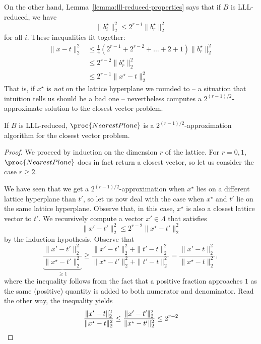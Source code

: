On the other hand,
Lemma~\ref{lemma:lll-reduced-properties} says that if $B$ is LLL-reduced, we have
\[
  \|b_i^\star\|_2^2 \leq 2^{r-i} \|b_r^\star\|_2^2
\]
for all $i$.
These inequalities fit together:
\begin{align*}
  \| x - t \|_2^2 &\leq \frac{1}{4} (2^{r-1} + 2^{r-2} + \dots + 2 + 1) \|b_r^\star\|_2^2 \\
    &\leq 2^{r-2} \|b_r^\star\|_2^2 \\
    &\leq 2^{r-1} \| x^\star - t \|_2^2
\end{align*}
That is, if $x^\star$ is \emph{not} on the lattice hyperplane we rounded to -- a situation
that intuition tells us should be a bad one --
 nevertheless computes a $2^{(r-1)/2}$-approximate solution to the closest vector problem.

\begin{theorem}
  If $B$ is LLL-reduced, $\proc{NearestPlane}$ is a $2^{(r-1)/2}$-approximation algorithm
  for the closest vector problem.
\end{theorem}
\begin{proof}
  We proceed by induction on the dimension $r$ of the lattice.
  For $r = 0,1$, $\proc{NearestPlane}$ does in fact return a closest vector,
  so let us consider the case $r \geq 2$.

  We have seen that we get a $2^{(r-1)/2}$-approximation when $x^\star$ lies on a different lattice hyperplane than $t'$,
  so let us now deal with the case when $x^\star$ and $t'$ lie on the same lattice hyperplane.
  Observe that, in this case, $x^\star$ is also a closest lattice vector to $t'$.
  We recursively compute a vector $x' \in \Lambda$ that satisfies
  \[
    \| x' - t' \|_2^2 \leq 2^{r-2} \| x^\star - t' \|_2^2
  \]
  by the induction hypothesis.
  Observe that
  \[
    \underbrace{\frac{ \| x' - t' \|_2^2 }{ \| x^\star - t' \|_2^2 }}_{\geq 1}
    \geq \frac{ \| x' - t' \|_2^2 + \| t' - t \|_2^2 }{ \| x^\star - t' \|_2^2 + \| t' - t \|_2^2 }
    = \frac{ \| x' - t \|_2^2 }{ \| x^\star - t \|_2^2 },
  \]
  where the inequality follows from the fact that a positive fraction approaches $1$
  as the same (positive) quantity is added to both numerator and denominator.
  Read the other way, the inequality yields
  \[
    \frac{ \| x' - t \|_2^2 }{ \| x^\star - t \|_2^2 } \leq  \frac{ \| x' - t' \|_2^2 }{ \| x^\star - t' \|_2^2 } \leq 2^{r-2}
    \qedhere
  \]
\end{proof}








